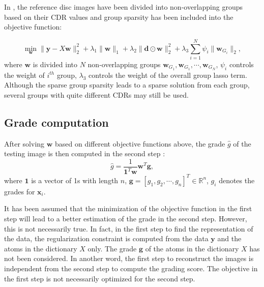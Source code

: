 \documentclass[journal]{IEEEtran}
\begin{document}
    In \cite{Cheng:17BOE}, the reference disc images have been divided into non-overlapping groups based on their CDR values  and  group sparsity has been included into the objective function:

      \begin{equation} \min_{\textbf{w}}\|{\textbf{y}}-{X}\textbf{w}\|^2_2+ \lambda_1 \|\textbf{w}\|_1+ \lambda_2\| \textbf{d}\odot \textbf{w}\|_2^2+\lambda_3   \sum_{i=1}^N\psi_i\|\textbf{w}_{G_i}\|_2,
    \end{equation}
   where $\textbf{w}$ is divided into $N$ non-overlapping groups $\textbf{w}_{G_1}, \textbf{w}_{G_1}, \cdots, \textbf{w}_{G_N}$, $\psi_i$ controls the weight of $i^{th}$ group,
   ${\lambda_3}$ controls the weight of the overall group lasso term.
   Although the sparse group sparsity leads to a sparse solution from each group, several groups with quite different CDRs may still be used.

       \subsection{Grade computation}
   After solving $\textbf{w}$   based on different objective functions above,  the grade $\hat{g}$  of the testing image is then computed in the second step \cite{CJ15}:
  \begin{equation}
  \hat{g}=\frac{1}{\textbf{1}^T\textbf{w}}\textbf{w}^T\textbf{g} ,   \label{eq5}
  \end{equation}
  where $\textbf{1}$ is a vector of 1s with length $n$, $\textbf{g}=[g_1, g_2, \cdots, g_n]^T\in \mathbb{R}^n$, $g_i$ denotes the grades for $\textbf{x}_i$.

 It has been assumed that the minimization of the objective function in the first step will lead to a better estimation of the grade in the second step. However, this is not necessarily  true.
         In fact, in the first step to find the representation of the data, the regularization constraint is computed from the data $\textbf{y}$ and the atoms in the dictionary $X$ only. The grade $\textbf{g}$ of the atoms in the dictionary $X$ has not been considered.  In another word,  the first step to reconstruct the images is independent from the second step to compute the grading score. The objective in the first step is not necessarily optimized for the second step.
\end{document}
